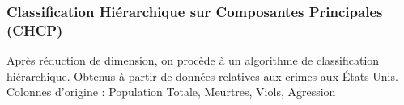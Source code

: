 
\begin{frame}
  \frametitle{Classification Hiérarchique sur Composantes Principales (CHCP)}
  Après réduction de dimension, on procède à un algorithme de classification hiérarchique.
  Obtenus à partir de données relatives aux crimes aux États-Unis. \\
  Colonnes d'origine : Population Totale, Meurtres, Viols, Agression
\end{frame}

